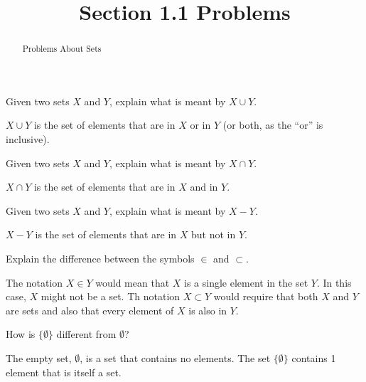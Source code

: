 \documentclass{ximera}
\title{Section 1.1 Problems}
\begin{document}
\begin{abstract}
Problems About Sets    
\end{abstract}
\maketitle


\begin{problem}
Given two sets $X$ and $Y$, explain what is meant by $X\cup Y$.
\begin{freeResponse}
$X\cup Y$ is the set of elements that are in $X$ or in $Y$ (or both, as the ``or'' is inclusive).  
\end{freeResponse}
\end{problem}

\begin{problem}
Given two sets $X$ and $Y$, explain what is meant by $X\cap Y$.
\begin{freeResponse}
$X\cap Y$ is the set of elements that are in $X$ and in $Y$.  
\end{freeResponse}
\end{problem}

\begin{problem}
Given two sets $X$ and $Y$, explain what is meant by $X - Y$.
\begin{freeResponse}
$X - Y$ is the set of elements that are in $X$ but not in $Y$.  
\end{freeResponse}
\end{problem}

\begin{problem}
Explain the difference between the symbols $\in$ and $\subset$.
\begin{freeResponse}
The notation $X \in Y$ would mean that $X$ is a single element in the set $Y$.  In this case, $X$ might not be a set.  Th notation $X \subset Y$ would require that both $X$ and $Y$ are sets and also that every element of $X$ is also in $Y$.
\end{freeResponse}
\end{problem}

\begin{problem}
How is $\{\emptyset\}$ different from $\emptyset$?  
\begin{freeResponse}
The empty set, $\emptyset$, is a set that contains no elements.  The set $\{\emptyset\}$ contains 1 element that is itself a set.  
\end{freeResponse}
\end{problem}
\end{document}
